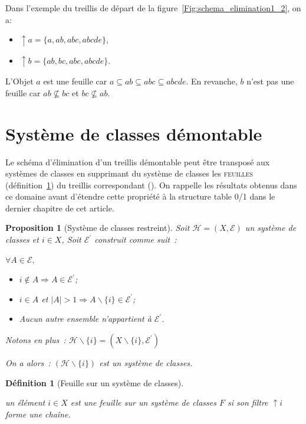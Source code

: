 \documentclass[a4paper]{report}
\newtheorem{definition}{Définition}[chapter]
\newtheorem{proposition}{Proposition}[chapter]
\begin{document}
Dans l'exemple du treillis de départ de la figure~\ref{Fig:schema_elimination1_2}, on a:
\begin{itemize}
\item $\uparrow a =\{a, ab, abc, abcde \}$,
\item $\uparrow b =\{ab, bc, abc, abcde \}$. 
\end{itemize}

L'Objet $a$ est une feuille car $a \subseteq ab \subseteq abc \subseteq abcde$. En revanche, 
$b$ n'est pas une feuille car $ab  \not\subseteq  bc$ et  $bc  \not\subseteq ab$.
 

\section{Système de classes démontable}

\label{sysd}

Le schéma d'élimination d'un treillis démontable peut \^etre transposé
aux systèmes de classes en supprimant du système de classes les \textsc{feuilles} (défini\-tion~\ref{feuillesys}) du treillis correspondant (\cite{par_clu}).
On rappelle les résultats obtenus dans ce domaine avant d'étendre cette propriété à la structure table 0/1 dans le dernier chapitre de  cet article.

\begin{proposition}[Système de classes restreint]

Soit $\mathcal{H} = (X, \mathcal{E})$ un sys\-tème de classes et $i \in X$,
Soit $\mathcal{E}^{'}$ construit comme suit~:

$\forall A \in \mathcal{E},$
\begin{itemize}
 \item $i \notin A \Rightarrow A \in \mathcal{E}^{'}$;
 \item $i \in A$ et $|A| > 1  \Rightarrow A \backslash \{i\}  \in \mathcal{E}^{'}$;
 \item Aucun autre ensemble n'appartient à $\mathcal{E}^{'}$.
\end{itemize}

Notons en plus~: $\mathcal{H} \backslash \{i\} = (X \backslash \{i\} , \mathcal{E}^{'})$

On a alors~: 
$(\mathcal{H} \backslash \{i\})$ est un système de classes.

\end{proposition}

\begin{definition}[Feuille sur un système de classes]

\label{feuillesys}

un élément $i \in X$ est une feuille sur un système de classes $F$ si son filtre  $\uparrow i$ forme une chaîne.
\end{definition}
\end{document}
